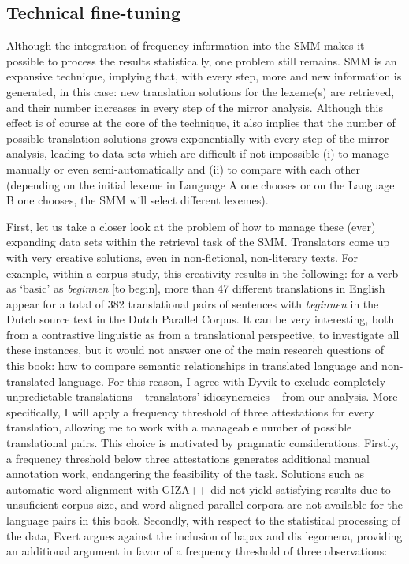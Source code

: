 \subsection{\label{sec:3.5.3}  Technical fine-tuning}

Although the integration of frequency information into the SMM makes it possible to process the results statistically, one problem still remains. SMM is an expansive technique, implying that, with every step, more and new information is generated, in this case: new translation solutions for the lexeme(s) are retrieved, and their number increases in every step of the mirror analysis. Although this effect is of course at the core of the technique, it also implies that the number of possible translation solutions grows exponentially with every step of the mirror analysis, leading to data sets which are difficult if not impossible (i) to manage manually or even semi-automatically and (ii) to compare with each other (depending on the initial lexeme in Language A one chooses or on the Language B one chooses, the SMM will select different lexemes).



First, let us take a closer look at the problem of how to manage these (ever) expanding data sets within the retrieval task of the SMM. Translators come up with very creative solutions, even in non-fictional, non-literary texts. For example, within a corpus study, this creativity results in the following: for a verb as ‘basic’ as \textit{beginnen} [to begin], more than 47 different translations in English appear for a total of 382 translational pairs of sentences with \textit{beginnen} in the Dutch source text in the Dutch Parallel Corpus. It can be very interesting, both from a contrastive linguistic as from a translational perspective, to investigate all these instances, but it would not answer one of the main research questions of this book: how to compare semantic relationships in translated language and non-translated language. For this reason, I agree with Dyvik to exclude completely unpredictable translations – translators’ idiosyncracies – from our analysis. More specifically, I will apply a frequency threshold of three attestations for every translation, allowing me to work with a manageable number of possible translational pairs. This choice is motivated by pragmatic considerations. Firstly, a frequency threshold below three attestations generates additional manual annotation work, endangering the feasibility of the task. Solutions such as automatic word alignment with GIZA++ did not yield satisfying results due to unsuficient corpus size, and word aligned parallel corpora are not available for the language pairs in this book. Secondly, with respect to the statistical processing of the data, Evert argues against the inclusion of hapax and dis legomena, providing an additional argument in favor of a frequency threshold of three observations:


